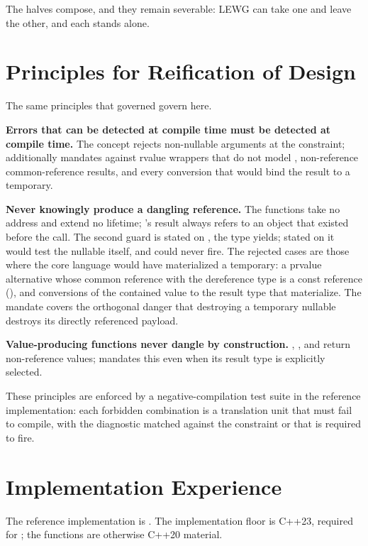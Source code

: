 \documentclass[a4paper,10pt,oneside,openany,final,article]{memoir}
\begin{document}
The halves compose, and they remain severable: LEWG can take one and leave
the other, and each stands alone.

\chapter{Principles for Reification of Design}

The same principles that governed \cite{P2988R12} govern here.

\textbf{Errors that can be detected at compile time must be detected at
compile time.} The concept rejects non-nullable arguments at the
constraint;  additionally mandates against rvalue
wrappers that do not model , non-reference
common-reference results, and every conversion that would bind the result to
a temporary.

\textbf{Never knowingly produce a dangling reference.} The functions take
no address and extend no lifetime; 's result always
refers to an object that existed before the call. The second guard is stated
on , the type  yields; stated on
 it would test the nullable itself, and could never fire. The rejected cases are those where the core language would
have materialized a temporary: a prvalue alternative whose common reference
with the dereference type is a const reference
(), and conversions of the contained value
to the result type that materialize.
The  mandate covers the orthogonal danger that
destroying a temporary nullable destroys its directly referenced payload.

\textbf{Value-producing functions never dangle by construction.}
, , and  return
non-reference values;  mandates this even when its result
type is explicitly selected.

These principles are enforced by a negative-compilation test suite in the
reference implementation: each forbidden combination is a translation unit
that must fail to compile, with the diagnostic matched against the
constraint or  that is required to fire.

\chapter{Implementation Experience}

The reference implementation is 
\cite{Downey_free_value_or}. The implementation floor is C++23, required
for ; the functions are
otherwise C++20 material.
\end{document}
